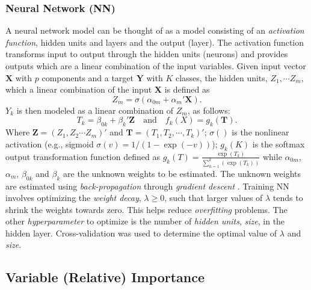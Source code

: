 \subsubsection{Neural Network (NN)}
\noindent A neural network model can be thought of as a model consisting of an \textit{activation function}, hidden units and layers and the output (layer). The activation function transforms input to output through the hidden units (neurons) and provides outputs which are a linear combination of the input variables.
\noindent Given input vector $\mathbf{X}$ with $p$ components and a target $\mathbf{Y}$ with $K$ classes, the hidden units, $Z_1, \cdots Z_m$, which a linear combination of the input $\mathbf{X}$ is defined as $$Z_m = \sigma(\alpha_{0m} + \alpha_m'\mathbf{X}).$$ $Y_k$ is then modeled as a linear combination of $Z_m$, as follows: $$T_k = \beta_{0k} + \beta_k'\mathbf{Z} \quad \text{and} \quad f_k(X) = g_k(\mathbf{T}).$$ Where $\mathbf{Z} = (Z_1, Z_2 \cdots Z_m)'$ and $\mathbf{T} = (T_1, T_2, \cdots, T_k)'$; $\sigma()$ is the nonlinear activation (e.g., sigmoid $\sigma(v) = 1/(1-\exp(-v))$); $g_k(K)$ is the softmax output transformation function defined as $g_k(T) = \frac{\exp(T_k)}{\sum_{h=1}^k(\exp(T_k))}$ while $\alpha_{0m}$, $\alpha_m$, $\beta_{0k}$ and $\beta_k$ are the unknown weights to be estimated. The unknown weights are estimated using \textit{back-propagation} through \textit{gradient descent} \cite{trevor2009elements}. Training NN involves optimizing the \textit{weight decay}, $\lambda\geq0$, such that larger values of $\lambda$ tends to shrink the weights towards zero. This helps reduce \textit{overfitting} problems. The other \textit{hyperparameter} to optimize is the number of \textit{hidden units}, \textit{size}, in the hidden layer. Cross-validation was used to determine the optimal value of $\lambda$ and \textit{size}.

\subsection{Variable (Relative) Importance}

